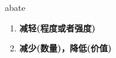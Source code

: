 
\begin{frame}
{\huge abate}
\begin{center}
\begin{enumerate}\Large
  \item \textbf{减轻(程度或者强度)}
  \item \textbf{减少(数量)，降低(价值)}
\end{enumerate}
\end{center}
\end{frame}

